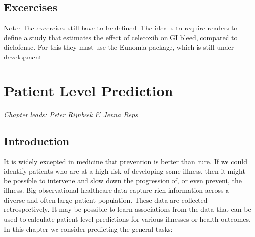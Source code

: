 \documentclass[11pt]{book}
\theoremstyle{definition}
\theoremstyle{definition}
\theoremstyle{definition}
\theoremstyle{remark}
\begin{document}
\hypertarget{excercises}{%
\section{Excercises}\label{excercises}}

Note: The excercises still have to be defined. The idea is to require readers to define a study that estimates the effect of celecoxib on GI bleed, compared to diclofenac. For this they must use the Eunomia package, which is still under development.

\hypertarget{PatientLevelPrediction}{%
\chapter{Patient Level Prediction}\label{PatientLevelPrediction}}

\emph{Chapter leads: Peter Rijnbeek \& Jenna Reps}

\hypertarget{introduction}{%
\section{Introduction}\label{introduction}}

It is widely excepted in medicine that prevention is better than cure. If we could identify patients who are at a high risk of developing some illness, then it might be possible to intervene and slow down the progression of, or even prevent, the illness. Big observational healthcare data capture rich information across a diverse and often large patient population. These data are collected retrospectively. It may be possible to learn associations from the data that can be used to calculate patient-level predictions for various illnesses or health outcomes. In this chapter we consider predicting the general tasks:
\end{document}

